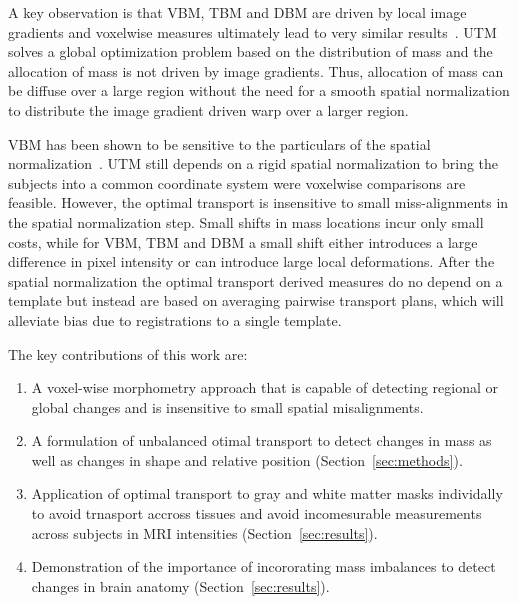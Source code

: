 \documentclass{llncs}
\begin{document}
A key observation is that VBM, TBM and DBM are driven by local image gradients
and voxelwise measures ultimately lead to very similar
results~\cite[Chaper~6]{frackowiak2004human}.  UTM solves a global optimization
problem based on the distribution of mass and the allocation of mass is not
driven by image gradients. Thus, allocation of mass can be diffuse over a large
region without the need for a smooth spatial normalization to distribute the
image gradient driven warp over a larger region. 

VBM has been shown to be sensitive to the particulars of the spatial
normalization~\cite{bookstein2001voxel,davatzikos2004voxel}. UTM still depends
on a rigid spatial normalization to bring the subjects into a common coordinate
system were voxelwise comparisons are feasible. However, the optimal transport
is insensitive to small miss-alignments in the spatial normalization step.
Small shifts in mass locations incur only small costs, while for VBM, TBM and
DBM a small shift either introduces a large difference in pixel intensity or
can introduce large local deformations.  After the spatial normalization the
optimal transport derived measures do no depend on a template but instead are
based on averaging pairwise transport plans, which will alleviate bias due to
registrations to a single template. 


The key contributions of this work are:
\vspace{-1mm}
\begin{enumerate}
\item A voxel-wise morphometry approach that is capable of detecting regional
  or global changes and is insensitive to small spatial misalignments.
\item A formulation of unbalanced otimal transport to detect changes in mass as
  well as changes in shape and relative position (Section~\ref{sec:methods}).
\item Application of optimal transport to gray and white matter masks
  individally to avoid trnasport accross tissues and avoid incomesurable
  measurements across subjects in MRI intensities (Section~\ref{sec:results}).
\item Demonstration of the importance of incororating mass imbalances to detect
  changes in brain anatomy (Section~\ref{sec:results}).  
\end{enumerate}
\end{document}
